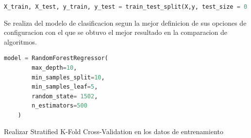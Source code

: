 \begin{lstlisting}[language=Python, caption=Division datos de entrenamiento, label=lst:train_test_split_RFC]
    X_train, X_test, y_train, y_test = train_test_split(X,y, test_size = 0.2,random_state= 1502)
\end{lstlisting}

Se realiza del modelo de clasificacion segun la mejor definicion de sus opciones de configuracion con el que se obtuvo el mejor resultado en la comparacion de algoritmos.

\begin{lstlisting}[language=Python, caption=Deficion de modelo RandomForestRegressor, label=lst:def_RFC]
    model = RandomForestRegressor( 
        max_depth=10, 
        min_samples_split=10, 
        min_samples_leaf=5,
        random_state= 1502,
        n_estimators=500
    )
\end{lstlisting}

Realizar Stratified K-Fold Cross-Validation en los datos de entrenamiento

